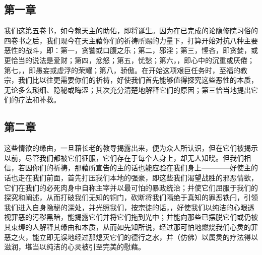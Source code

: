 \subsection{第一章}

\par

我们这第五卷书，如今赖天主的助佑，即将诞生。因为在已完成的论隐修院习俗的四卷书之后，我们现今在天主藉你们的祈祷所赐的力量下，打算开始对抗八种主要恶性的战斗，即：第一，贪饕或口腹之乐；第二，邪淫；第三，悭吝，即贪婪，或更恰当的说法是爱财；第四，忿怒；第五，忧愁；第六，，即心中的沉重或厌倦；第七，，即愚妄或虚浮的荣耀；第八，骄傲。在开始这项艰巨任务时，至福的教宗，我们比以往更需要你们的祈祷，好使我们首先能够值得探究这些恶性的本质，无论多么琐细、隐秘或晦涩；其次充分清楚地解释它们的原因；第三恰当地提出它们的疗法和补救。\par


\subsection{第二章}

\par

这些情欲的缘由，一旦藉长老的教导揭露出来，便为众人所认识，但在它们被揭示以前，尽管我们都被它们征服，它们存在于每个人身上，却无人知晓。但我们相信，若因你们的祈祷，那藉所宣告的主的话也能应验在我们身上————好使主的话也走在我们前面，首先打压我们本地的强豪，即这些我们渴望战胜的邪恶情欲，它们在我们的必死肉身中自称主宰并以最可怕的暴政统治；并使它们屈服于我们的探究和阐述，从而打破我们无知的铜门，砍断将我们隔绝于真知的罪恶铁闩，引领我们进入自身隐秘的深处，并光照我们，按宗徒的话，，好使我们以纯洁的心眼透视罪恶的污秽黑暗，能揭露它们并将它们拖到光中；并能向那些已摆脱它们或仍被其束缚的人解释其缘由和本质，从而如先知所说，经过那可怕地燃烧我们心灵的罪恶之火，能立即无误地经过那熄灭它们的德行之水，并（仿佛）以属灵的疗法得以滋润，堪当以纯洁的心灵被引至完美的慰藉。\par


